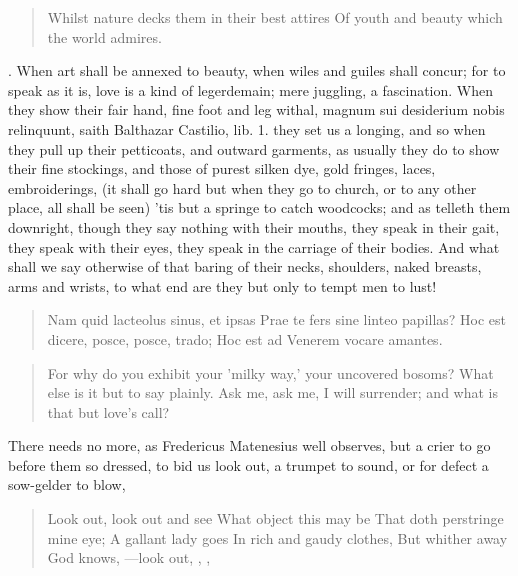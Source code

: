 \begin{verse}%
Whilst nature decks them in their best attires
Of youth and beauty which the world admires.
\end{verse}%

. When art shall
be annexed to beauty, when wiles and guiles shall concur; for to speak
as it is, love is a kind of legerdemain; mere juggling, a fascination.
When they show their fair hand, fine foot and leg withal, magnum sui
desiderium nobis relinquunt, saith Balthazar Castilio, lib. 1.
they set us a longing, and so when they pull up their petticoats, and
outward garments, as usually they do to show their fine stockings, and
those of purest silken dye, gold fringes, laces, embroiderings, (it
shall go hard but when they go to church, or to any other place, all
shall be seen) 'tis but a springe to catch woodcocks; and as
\Chrysostom{} telleth them downright, though they say nothing with
their mouths, they speak in their gait, they speak with their eyes,
they speak in the carriage of their bodies. And what shall we say
otherwise of that baring of their necks, shoulders, naked breasts, arms
and wrists, to what end are they but only to tempt men to lust!

\begin{latin}
\begin{verse}%
Nam quid lacteolus sinus, et ipsas
Prae te fers sine linteo papillas?
Hoc est dicere, posce, posce, trado;
Hoc est ad Venerem vocare amantes.
\end{verse}%
\end{latin}
\translationrule%
\begin{verse}%
For why do you exhibit your 'milky way,'
your uncovered bosoms?
What else is it but to say plainly.
Ask me, ask me, I will surrender;
and what is that but love's call?
\end{verse}%

There needs no more, as Fredericus Matenesius well observes, but
a crier to go before them so dressed, to bid us look out, a trumpet to
sound, or for defect a sow-gelder to blow,

\begin{verse}%
Look out, look out and see
What object this may be
That doth perstringe mine eye;
A gallant lady goes
In rich and gaudy clothes,
But whither away God knows,
---look out, \etc{}, ,
\end{verse}%

